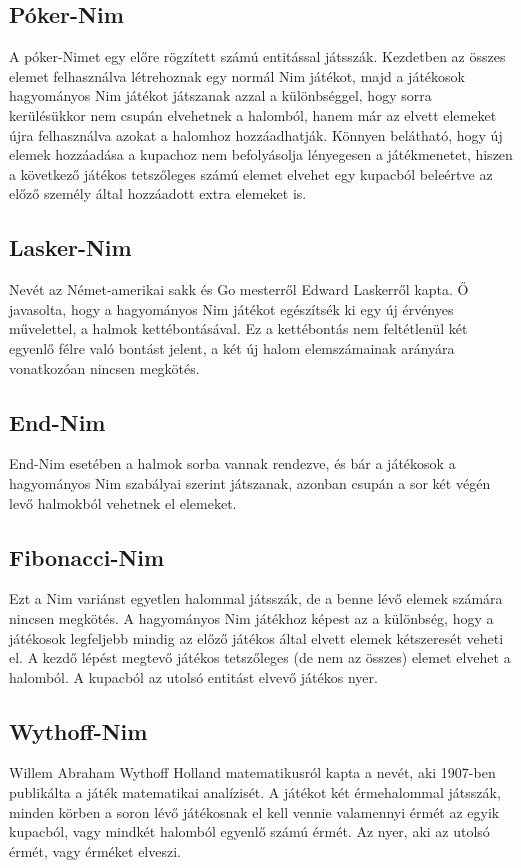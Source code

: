 \subsection{Póker-Nim}
A póker-Nimet egy előre rögzített számú entitással játsszák. Kezdetben az összes elemet felhasználva létrehoznak egy normál Nim játékot, majd a játékosok hagyományos Nim játékot játszanak azzal a különbséggel, hogy sorra kerülésükkor nem csupán elvehetnek a halomból, hanem már az elvett elemeket újra felhasználva azokat a halomhoz hozzáadhatják. \ujsor
Könnyen belátható, hogy új elemek hozzáadása a kupachoz nem befolyásolja lényegesen a játékmenetet, hiszen a következő játékos tetszőleges számú elemet elvehet egy kupacból beleértve az előző személy által hozzáadott extra elemeket is.

\subsection{Lasker-Nim}
Nevét az Német-amerikai sakk és Go mesterről Edward Laskerről kapta. Ő javasolta, hogy a hagyományos Nim játékot egészítsék ki egy új érvényes művelettel, a halmok kettébontásával. Ez a kettébontás nem feltétlenül két egyenlő félre való bontást jelent, a két új halom elemszámainak arányára vonatkozóan nincsen megkötés.

\subsection{End-Nim}
End-Nim esetében a halmok sorba vannak rendezve, és bár a játékosok a hagyományos Nim szabályai szerint játszanak, azonban csupán a sor két végén levő halmokból vehetnek el elemeket.

\subsection{Fibonacci-Nim}
Ezt a Nim variánst egyetlen halommal játsszák, de a benne lévő elemek számára nincsen megkötés. A hagyományos Nim játékhoz képest az a különbség, hogy a játékosok legfeljebb mindig az előző játékos által elvett elemek kétszeresét veheti el. A kezdő lépést megtevő játékos tetszőleges (de nem az összes) elemet elvehet a halomból. A kupacból az utolsó entitást elvevő játékos nyer.

\subsection{Wythoff-Nim}
Willem Abraham Wythoff Holland matematikusról kapta a nevét, aki 1907-ben publikálta a játék matematikai analízisét. A játékot két érmehalommal játsszák, minden körben a soron lévő játékosnak el kell vennie valamennyi érmét az egyik kupacból, vagy mindkét halomból egyenlő számú érmét. Az nyer, aki az utolsó érmét, vagy érméket elveszi. \ujsor

